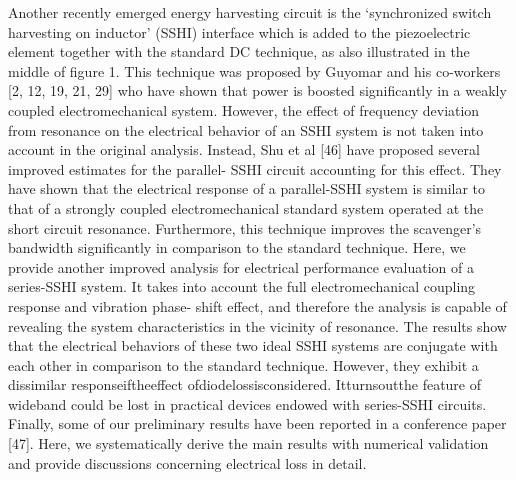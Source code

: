 \documentclass{article}
\begin{document}
Another recently emerged energy harvesting circuit is the
‘synchronized switch harvesting on inductor’ (SSHI) interface
which is added to the piezoelectric element together with the
standard DC technique, as also illustrated in the middle of
figure 1. This technique was proposed by Guyomar and his
co-workers [2, 12, 19, 21, 29] who have shown that power is
boosted significantly in a weakly coupled electromechanical
system. However, the effect of frequency deviation from
resonance on the electrical behavior of an SSHI system is not
taken into account in the original analysis. Instead, Shu et al
[46] have proposed several improved estimates for the parallel-
SSHI circuit accounting for this effect. They have shown that
the electrical response of a parallel-SSHI system is similar to
that of a strongly coupled electromechanical standard system
operated at the short circuit resonance. Furthermore, this
technique improves the scavenger’s bandwidth significantly
in comparison to the standard technique. Here, we
provide another improved analysis for electrical performance
evaluation of a series-SSHI system. It takes into account the
full electromechanical coupling response and vibration phase-
shift effect, and therefore the analysis is capable of revealing
the system characteristics in the vicinity of resonance. The
results show that the electrical behaviors of these two ideal
SSHI systems are conjugate with each other in comparison
to the standard technique. However, they exhibit a dissimilar
responseiftheeffect ofdiodelossisconsidered. Itturnsoutthe
feature of wideband could be lost in practical devices endowed
with series-SSHI circuits. Finally, some of our preliminary
results have been reported in a conference paper [47]. Here,
we systematically derive the main results with numerical
validation and provide discussions concerning electrical loss
in detail.
\end{document}
